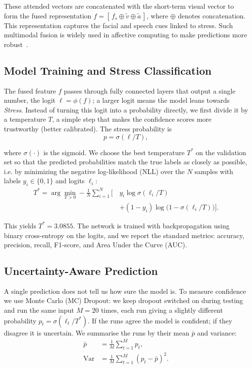 \documentclass[conference]{IEEEtran}
\begin{document}
These attended vectors are concatenated with the short-term visual vector to form the fused representation $f = [\,f_s \oplus \tilde{v} \oplus \tilde{a}\,]$, where $\oplus$ denotes concatenation. This representation captures the facial and speech cues linked to stress. Such multimodal fusion is widely used in affective computing to make predictions more robust~\cite{ref2}.
\subsection{Model Training and Stress Classification}

The fused feature $f$ passes through fully connected layers that output a single number, the logit $\ell = \phi(f)$; a larger logit means the model leans towards \textit{Stress}. Instead of turning this logit into a probability directly, we first divide it by a temperature $T$, a simple step that makes the confidence scores more trustworthy (better calibrated). The stress probability is
\begin{equation}
p = \sigma(\ell / T),
\end{equation}

where $\sigma(\cdot)$ is the sigmoid. We choose the best temperature $T^{*}$ on the validation set so that the predicted probabilities match the true labels as closely as possible, i.e. by minimizing the negative log-likelihood (NLL) over the $N$ samples with labels $y_i \in \{0,1\}$ and logits $\ell_i$:
\begin{equation}
\begin{split}
T^{*} = \arg\min_{T>0} -\frac{1}{N}\sum_{i=1}^{N}\big[\, & y_i \log \sigma(\ell_i/T) \\
& + (1-y_i)\log\big(1-\sigma(\ell_i/T)\big) \big].
\end{split}
\end{equation}

This yields $T^{*}=3.0855$. The network is trained with backpropagation using binary cross-entropy on the logits, and we report the standard metrics: accuracy, precision, recall, F1-score, and Area Under the Curve (AUC).

\subsection{Uncertainty-Aware Prediction}

A single prediction does not tell us how sure the model is. To measure confidence we use Monte Carlo (MC) Dropout: we keep dropout switched on during testing and run the same input $M=20$ times, each run giving a slightly different probability $p_t = \sigma(\ell_t/T^{*})$. If the runs agree the model is confident; if they disagree it is uncertain. We summarise the runs by their mean $\bar{p}$ and variance:
\begin{equation}
\begin{aligned}
\bar{p} &= \frac{1}{M}\sum_{t=1}^{M} p_t, \\
\mathrm{Var} &= \frac{1}{M}\sum_{t=1}^{M} (p_t - \bar{p})^2.
\end{aligned}
\end{equation}
\end{document}
